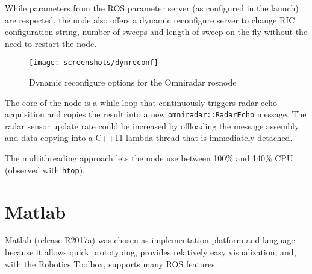 While parameters from the ROS parameter server (as configured in the
launch) are respected, the node also offers a dynamic reconfigure server
to change RIC configuration string, number of sweeps and length of sweep
on the fly without the need to restart the node.

\begin{figure}[htbp]
    \centering
    \label{fig:dynreconf}
    \texttt{[image: screenshots/dynreconf]}
    \caption{Dynamic reconfigure options for the Omniradar rosnode}
\end{figure}

The core of the node is a while loop that continuously triggers radar
echo acquisition and copies the result into a new
\texttt{omniradar::RadarEcho} message. The radar sensor update rate
could be increased by offloading the message assembly and data copying
into a C++11 lambda thread that is immediately detached.

\begin{Shaded}
\begin{Highlighting}[]

\NormalTok{    [=] ()}
\NormalTok{    \{}
\NormalTok{    \}}
\NormalTok{);}
\end{Highlighting}
\end{Shaded}

The multithreading approach lets the node use between 100\% and 140\%
CPU (observed with \texttt{htop}).

\section{Matlab}\label{matlab}

Matlab (release R2017a) was chosen as implementation platform and
language because it allows quick prototyping, provides relatively easy
visualization, and, with the Robotics Toolbox, supports many ROS
features.


